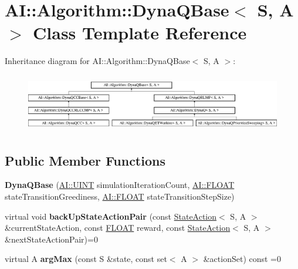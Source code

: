 \hypertarget{classAI_1_1Algorithm_1_1DynaQBase}{\section{A\-I\-:\-:Algorithm\-:\-:Dyna\-Q\-Base$<$ S, A $>$ Class Template Reference}
\label{classAI_1_1Algorithm_1_1DynaQBase}
}
Inheritance diagram for A\-I\-:\-:Algorithm\-:\-:Dyna\-Q\-Base$<$ S, A $>$\-:\begin{figure}[H]
\begin{center}
\leavevmode
\includegraphics[height=2.557078cm]{classAI_1_1Algorithm_1_1DynaQBase}
\end{center}
\end{figure}
\subsection*{Public Member Functions}
\begin{DoxyCompactItemize}
\item 
\hypertarget{classAI_1_1Algorithm_1_1DynaQBase_a089f4024fab2f19179dea637b7f6c8ee}{{\bfseries Dyna\-Q\-Base} (\hyperlink{namespaceAI_ab6e14dc1e659854858a87e511f1439ec}{A\-I\-::\-U\-I\-N\-T} simulation\-Iteration\-Count, \hyperlink{namespaceAI_a41b74884a20833db653dded3918e05c3}{A\-I\-::\-F\-L\-O\-A\-T} state\-Transition\-Greediness, \hyperlink{namespaceAI_a41b74884a20833db653dded3918e05c3}{A\-I\-::\-F\-L\-O\-A\-T} state\-Transition\-Step\-Size)}\label{classAI_1_1Algorithm_1_1DynaQBase_a089f4024fab2f19179dea637b7f6c8ee}

\item 
\hypertarget{classAI_1_1Algorithm_1_1DynaQBase_a0d5777706e9c2be04ee1834ad593c795}{virtual void {\bfseries back\-Up\-State\-Action\-Pair} (const \hyperlink{classAI_1_1StateAction}{State\-Action}$<$ S, A $>$ \&current\-State\-Action, const \hyperlink{namespaceAI_a41b74884a20833db653dded3918e05c3}{F\-L\-O\-A\-T} reward, const \hyperlink{classAI_1_1StateAction}{State\-Action}$<$ S, A $>$ \&next\-State\-Action\-Pair)=0}\label{classAI_1_1Algorithm_1_1DynaQBase_a0d5777706e9c2be04ee1834ad593c795}

\item 
\hypertarget{classAI_1_1Algorithm_1_1DynaQBase_a32044f721ba4afbca5ea144b3f84135b}{virtual A {\bfseries arg\-Max} (const S \&state, const set$<$ A $>$ \&action\-Set) const =0}\label{classAI_1_1Algorithm_1_1DynaQBase_a32044f721ba4afbca5ea144b3f84135b}

\end{DoxyCompactItemize}
